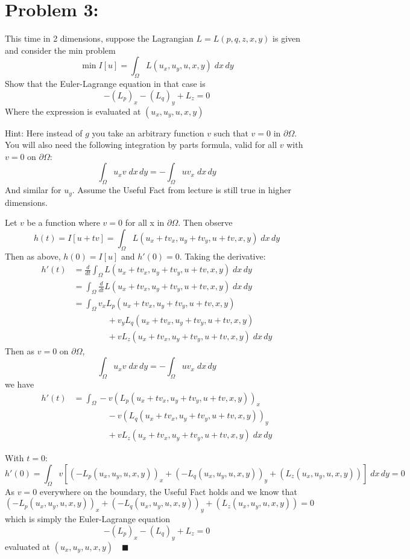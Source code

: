\documentclass[12pt]{article}
\newcommand{\qed}{\quad \blacksquare}
\begin{document}
\section*{Problem 3:}
This time in 2 dimensions, suppose the Lagrangian $L = L(p, q, z, x, y)$ is given and consider the min problem
\[\min I[u] = \int_{\Omega} L(u_x, u_y, u, x, y)\; dx\, dy\]
Show that the Euler-Lagrange equation in that case is
\[-(L_p)_x - (L_q)_y + L_z = 0\]
Where the expression is evaluated at $(u_x, u_y, u, x, y)$

Hint: Here instead of $g$ you take an arbitrary function $v$ such that $v = 0$ in $\partial \Omega$. You will also need the following integration by parts formula, valid for all $v$ with $v = 0$ on $\partial \Omega$:
\[\int_{\Omega} u_x v \; dx\, dy = -\int_{\Omega}uv_x\; dx\, dy\]
And similar for $u_y$. Assume the Useful Fact from lecture is still true in higher dimensions.

\color{blue}
Let $v$ be a function where $v = 0$ for all x in $\partial \Omega$. Then observe 
\[h(t) = I[u + tv] = \int_\Omega L(u_x + tv_x, u_y + tv_y, u + tv, x, y)\; dx\, dy\]
Then as above, $h(0) = I[u]$ and $h'(0) = 0$. Taking the derivative:
\begin{align*}
    h'(t) &= \frac{d}{dt}\int_\Omega L(u_x + tv_x, u_y + tv_y, u + tv, x, y)\; dx\, dy\\
    &= \int_\Omega \frac{d}{dt} L(u_x + tv_x, u_y + tv_y, u + tv, x, y)\; dx\, dy\\
    &= \int_{\Omega} v_xL_{p}(u_x + tv_x, u_y + tv_y, u + tv, x, y)\\
    &\qquad \qquad + v_y L_{q}(u_x + tv_x, u_y + tv_y, u + tv, x, y)\\
    &\qquad \qquad + vL_{z}(u_x + tv_x, u_y + tv_y, u + tv, x, y)\; dx\, dy
\end{align*}
Then as $v = 0$ on $\partial \Omega$,
\[\int_{\Omega} u_x v \; dx\, dy = -\int_{\Omega}uv_x\; dx\, dy\]
we have 
\begin{align*}
    h'(t) &= \int_{\Omega} -v(L_{p}(u_x + tv_x, u_y + tv_y, u + tv, x, y))_x\\
    &\qquad \qquad -v(L_{q}(u_x + tv_x, u_y + tv_y, u + tv, x, y))_y\\
    &\qquad \qquad + vL_{z}(u_x + tv_x, u_y + tv_y, u + tv, x, y)\; dx\, dy 
\end{align*}

With $t = 0$:
\[\!\!\!\!\!\!\!\!\!\!\!\!h'(0) = \int_{\Omega} v[(-L_p(u_x, u_y, u, x, y))_x + (-L_q(u_x, u_y, u, x, y))_y + (L_z(u_x, u_y, u, x, y))]\; dx\,dy = 0\]
As $v=0$ everywhere on the boundary, the Useful Fact holds and we know that 
\[(-L_p(u_x, u_y, u, x, y))_x + (-L_q(u_x, u_y, u, x, y))_y + (L_z(u_x, u_y, u, x, y)) = 0\]
which is simply the Euler-Lagrange equation 
\[-(L_p)_x - (L_q)_y + L_z = 0\]
evaluated at $(u_x, u_y, u, x, y) \qed$
\color{black}
\end{document}

